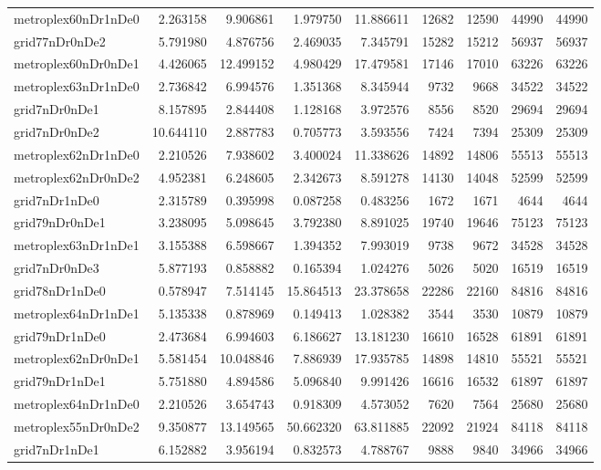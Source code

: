 \begin{longtable}{|l|r|r|r|r|r|r|r|r|}
metroplex60nDr1nDe0 & 2.263158 & 9.906861 & 1.979750 & 11.886611 & 12682 & 12590 & 44990 & 44990 \\
grid77nDr0nDe2 & 5.791980 & 4.876756 & 2.469035 & 7.345791 & 15282 & 15212 & 56937 & 56937 \\
metroplex60nDr0nDe1 & 4.426065 & 12.499152 & 4.980429 & 17.479581 & 17146 & 17010 & 63226 & 63226 \\
metroplex63nDr1nDe0 & 2.736842 & 6.994576 & 1.351368 & 8.345944 & 9732 & 9668 & 34522 & 34522 \\
grid7nDr0nDe1 & 8.157895 & 2.844408 & 1.128168 & 3.972576 & 8556 & 8520 & 29694 & 29694 \\
grid7nDr0nDe2 & 10.644110 & 2.887783 & 0.705773 & 3.593556 & 7424 & 7394 & 25309 & 25309 \\
metroplex62nDr1nDe0 & 2.210526 & 7.938602 & 3.400024 & 11.338626 & 14892 & 14806 & 55513 & 55513 \\
metroplex62nDr0nDe2 & 4.952381 & 6.248605 & 2.342673 & 8.591278 & 14130 & 14048 & 52599 & 52599 \\
grid7nDr1nDe0 & 2.315789 & 0.395998 & 0.087258 & 0.483256 & 1672 & 1671 & 4644 & 4644 \\
grid79nDr0nDe1 & 3.238095 & 5.098645 & 3.792380 & 8.891025 & 19740 & 19646 & 75123 & 75123 \\
metroplex63nDr1nDe1 & 3.155388 & 6.598667 & 1.394352 & 7.993019 & 9738 & 9672 & 34528 & 34528 \\
grid7nDr0nDe3 & 5.877193 & 0.858882 & 0.165394 & 1.024276 & 5026 & 5020 & 16519 & 16519 \\
grid78nDr1nDe0 & 0.578947 & 7.514145 & 15.864513 & 23.378658 & 22286 & 22160 & 84816 & 84816 \\
metroplex64nDr1nDe1 & 5.135338 & 0.878969 & 0.149413 & 1.028382 & 3544 & 3530 & 10879 & 10879 \\
grid79nDr1nDe0 & 2.473684 & 6.994603 & 6.186627 & 13.181230 & 16610 & 16528 & 61891 & 61891 \\
metroplex62nDr0nDe1 & 5.581454 & 10.048846 & 7.886939 & 17.935785 & 14898 & 14810 & 55521 & 55521 \\
grid79nDr1nDe1 & 5.751880 & 4.894586 & 5.096840 & 9.991426 & 16616 & 16532 & 61897 & 61897 \\
metroplex64nDr1nDe0 & 2.210526 & 3.654743 & 0.918309 & 4.573052 & 7620 & 7564 & 25680 & 25680 \\
metroplex55nDr0nDe2 & 9.350877 & 13.149565 & 50.662320 & 63.811885 & 22092 & 21924 & 84118 & 84118 \\
grid7nDr1nDe1 & 6.152882 & 3.956194 & 0.832573 & 4.788767 & 9888 & 9840 & 34966 & 34966 \\

\end{longtable}
